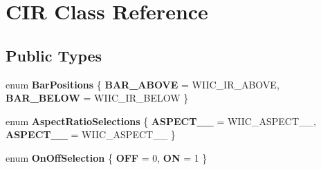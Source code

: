 \hypertarget{class_c_i_r}{\section{\-C\-I\-R \-Class \-Reference}
\label{class_c_i_r}
}
\subsection*{\-Public \-Types}
\begin{DoxyCompactItemize}
\item 
enum {\bfseries \-Bar\-Positions} \{ {\bfseries \-B\-A\-R\-\_\-\-A\-B\-O\-V\-E} =  \-W\-I\-I\-C\-\_\-\-I\-R\-\_\-\-A\-B\-O\-V\-E, 
{\bfseries \-B\-A\-R\-\_\-\-B\-E\-L\-O\-W} =  \-W\-I\-I\-C\-\_\-\-I\-R\-\_\-\-B\-E\-L\-O\-W
 \}
\item 
enum {\bfseries \-Aspect\-Ratio\-Selections} \{ {\bfseries \-A\-S\-P\-E\-C\-T\-\_\-\_} =  \-W\-I\-I\-C\-\_\-\-A\-S\-P\-E\-C\-T\-\_\-\_, 
{\bfseries \-A\-S\-P\-E\-C\-T\-\_\-\_} =  \-W\-I\-I\-C\-\_\-\-A\-S\-P\-E\-C\-T\-\_\-\_
 \}
\item 
enum {\bfseries \-On\-Off\-Selection} \{ {\bfseries \-O\-F\-F} =  0, 
{\bfseries \-O\-N} =  1
 \}
\end{DoxyCompactItemize}
